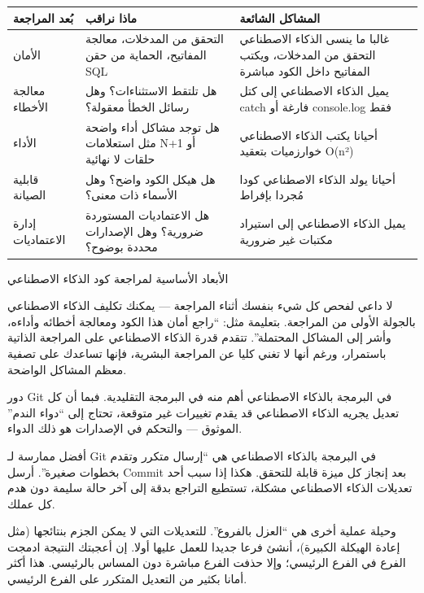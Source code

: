 \begin{center}
\begin{tabularx}{\linewidth}{|X|X|X|}
\hline
\textbf{بُعد المراجعة} & \textbf{ماذا نراقب} & \textbf{المشاكل الشائعة} \tabularnewline
\hline
الأمان & التحقق من المدخلات، معالجة المفاتيح، الحماية من حقن SQL & غالبا ما ينسى الذكاء الاصطناعي التحقق من المدخلات، ويكتب المفاتيح داخل الكود مباشرة \tabularnewline
معالجة الأخطاء & هل تلتقط الاستثناءات؟ وهل رسائل الخطأ معقولة؟ & يميل الذكاء الاصطناعي إلى كتل catch فارغة أو console.log فقط \tabularnewline
الأداء & هل توجد مشاكل أداء واضحة مثل استعلامات N+1 أو حلقات لا نهائية & أحيانا يكتب الذكاء الاصطناعي خوارزميات بتعقيد O(n²) \tabularnewline
قابلية الصيانة & هل هيكل الكود واضح؟ وهل الأسماء ذات معنى؟ & أحيانا يولد الذكاء الاصطناعي كودا مُجردا بإفراط \tabularnewline
إدارة الاعتماديات & هل الاعتماديات المستوردة ضرورية؟ وهل الإصدارات محددة بوضوح؟ & يميل الذكاء الاصطناعي إلى استيراد مكتبات غير ضرورية \tabularnewline
\hline
\end{tabularx}
\end{center}

\begin{center}\small\color{gray}الأبعاد الأساسية لمراجعة كود الذكاء الاصطناعي\end{center}

لا داعي لفحص كل شيء بنفسك أثناء المراجعة — يمكنك تكليف الذكاء الاصطناعي بالجولة الأولى من المراجعة. بتعليمة مثل: “راجع أمان هذا الكود ومعالجة أخطائه وأداءه، وأشر إلى المشاكل المحتملة”. تتقدم قدرة الذكاء الاصطناعي على المراجعة الذاتية باستمرار، ورغم أنها لا تغني كليا عن المراجعة البشرية، فإنها تساعدك على تصفية معظم المشاكل الواضحة.


دور Git في البرمجة بالذكاء الاصطناعي أهم منه في البرمجة التقليدية. فبما أن كل تعديل يجريه الذكاء الاصطناعي قد يقدم تغييرات غير متوقعة، تحتاج إلى “دواء الندم” الموثوق — والتحكم في الإصدارات هو ذلك الدواء.

أفضل ممارسة لـ Git في البرمجة بالذكاء الاصطناعي هي “إرسال متكرر وتقدم بخطوات صغيرة”. أرسل Commit بعد إنجاز كل ميزة قابلة للتحقق. هكذا إذا سبب أحد تعديلات الذكاء الاصطناعي مشكلة، تستطيع التراجع بدقة إلى آخر حالة سليمة دون هدم كل عملك.

وحيلة عملية أخرى هي “العزل بالفروع”. للتعديلات التي لا يمكن الجزم بنتائجها (مثل إعادة الهيكلة الكبيرة)، أنشئ فرعا جديدا للعمل عليها أولا. إن أعجبتك النتيجة ادمجت الفرع في الفرع الرئيسي؛ وإلا حذفت الفرع مباشرة دون المساس بالرئيسي. هذا أكثر أمانا بكثير من التعديل المتكرر على الفرع الرئيسي.

